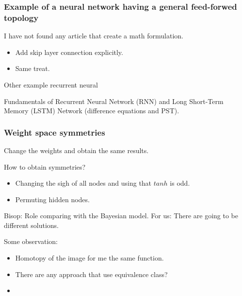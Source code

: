\begin{frame}
  \frametitle{Example of a neural network having a general feed-forwed topology}
  I have not found any article that create a math formulation. 
  \begin{itemize}
    \item Add skip layer connection explicitly. 
    \item Same treat. 
  \end{itemize}
Other example recurrent neural 

Fundamentals of Recurrent Neural Network (RNN) and Long Short-Term Memory (LSTM) Network
\cite{FundamentalsOfRecurrentNerualNetwork} (difference equations and PST). 
\end{frame}

\begin{frame}
  \frametitle{Weight space symmetries}

  Change the weights and obtain the same results.

  How to obtain symmetries?
  \begin{itemize}
    \item Changing the sigh of all nodes and using that $tanh$ is odd. 
    \item Permuting hidden nodes. 
  \end{itemize}
  Bisop: Role comparing with the Bayesian model. 
  For us: There are going to be different solutions. 
  
  Some observation: 
  \begin{itemize}
    \item Homotopy of the image for me the same function. 
    \item There are any approach that use equivalence class?
    \item \cite{OptimizingNeuralNetworksintheEquivalentClassSpace}
  \end{itemize}
\end{frame}


    